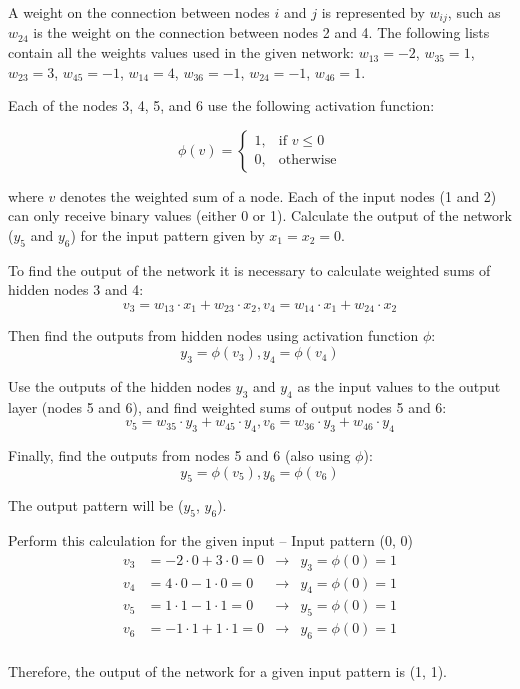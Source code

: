 \documentclass[12pt,a4paper]{exam}
\begin{document}
A weight on the connection between nodes $i$ and $j$ is represented by $w_{ij}$, such as $w_{24}$ is the weight on the connection between nodes 2 and 4. The following lists contain all the weights values used in the given network:
$w_{13}=-2$, $w_{35}=1$, $w_{23} = 3$, $w_{45} = -1$, $w_{14} = 4$, $w_{36} = -1$, $w_{24}=-1$, $w_{46}=1$.

Each of the nodes 3, 4, 5, and 6 use the following activation function:

\begin{equation*}
\phi(v) = \begin{cases}
1, & \text{if $v\leq0$}\\
0, & \text{otherwise}
\end{cases}
\end{equation*}

where $v$ denotes the weighted sum of a node. Each of the input nodes (1 and 2) can only receive binary values (either 0 or 1). Calculate the output of the network ($y_5$ and $y_6$) for the input pattern given by $x_1 = x_2 = 0$.
\fillwithlines{3cm}
\begin{solution}
To find the output of the network it is necessary to calculate weighted sums of hidden nodes 3 and 4:
\begin{equation*}
v_3 =w_{13}\cdot x_1 +w_{23}\cdot x_2 , v_4 =w_{14}\cdot x_1 +w_{24}\cdot x_2
\end{equation*}

Then find the outputs from hidden nodes using activation function $\phi$:
\begin{equation*}
y_3 =\phi(v_3), y_4 =\phi(v_4)
\end{equation*}

Use the outputs of the hidden nodes $y_3$ and $y_4$ as the input values to the output layer (nodes 5 and 6), and find weighted sums of output nodes 5 and 6:
\begin{equation*}
v_5 =w_{35}\cdot y_3 +w_{45}\cdot y_4 , v_6 =w_{36}\cdot y_3 +w_{46}\cdot y_4
\end{equation*}

Finally, find the outputs from nodes 5 and 6 (also using $\phi$):
\begin{equation*}
y_5 =\phi(v_5), y_6 =\phi(v_6)
\end{equation*}

The output pattern will be ($y_5$, $y_6$).

Perform this calculation for the given input – Input pattern (0, 0)
\begin{align*}
v_3 & =-2\cdot 0+3\cdot 0=0 &\rightarrow &y_3 =\phi(0)=1\\
v_4 &=4\cdot 0-1\cdot 0=0 &\rightarrow &y_4 =\phi(0)=1\\
v_5 &=1\cdot 1-1\cdot 1=0 &\rightarrow &y_5 =\phi(0)=1\\
v_6 &=-1\cdot 1+1\cdot 1=0 &\rightarrow &y_6 =\phi(0)=1\\
\end{align*}

Therefore, the output of the network for a given input pattern is (1, 1).
\end{solution}
\end{document}
